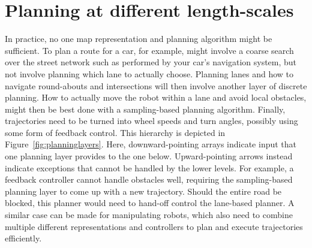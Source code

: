 \section{Planning at different length-scales}
In practice, no one map representation and planning algorithm might be sufficient. To plan a route for a car, for example, might involve a coarse search over the street network such as performed by your car's navigation system, but not involve planning which lane to actually choose. Planning lanes and how to navigate round-abouts and intersections will then involve another layer of discrete planning. How to actually move the robot within a lane and avoid local obstacles, might then be best done with a sampling-based planning algorithm. Finally, trajectories need to be turned into wheel speeds and turn angles, possibly using some form of feedback control. This hierarchy is depicted in Figure~\ref{fig:planninglayers}. Here, downward-pointing arrays indicate input that one planning layer provides to the one below. Upward-pointing arrows instead indicate exceptions that cannot be handled by the lower levels. For example, a feedback controller cannot handle obstacles well, requiring the sampling-based planning layer to come up with a new trajectory. Should the entire road be blocked, this planner would need to hand-off control the lane-based planner. A similar case can be made for manipulating robots, which also need to combine multiple different representations and controllers to plan and execute trajectories efficiently.

